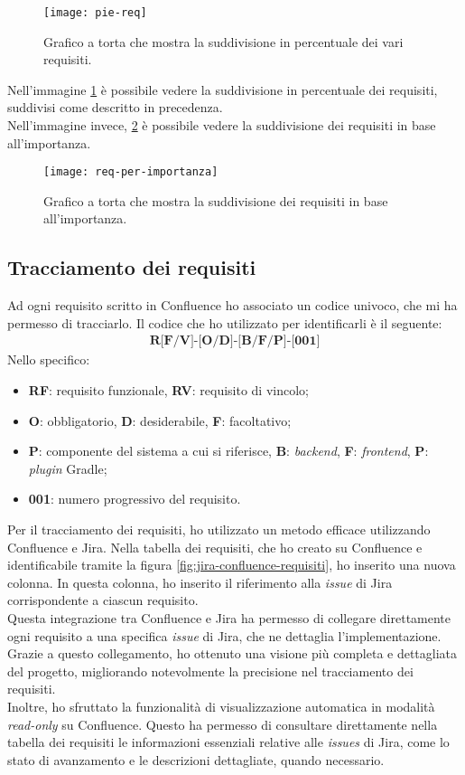 \begin{figure}[!h] 
  \centering 
  \texttt{[image: pie-req]} 
  \caption{Grafico a torta che mostra la suddivisione in percentuale dei vari requisiti.}
  \label{fig:pie-req}
\end{figure}
\noindent Nell'immagine \ref*{fig:pie-req} è possibile vedere la suddivisione in percentuale dei requisiti, 
suddivisi come descritto in precedenza.\\
Nell'immagine invece, \ref*{fig:req-per-importanza} è possibile vedere la suddivisione dei requisiti in base all'importanza.
\begin{figure}[!h] 
  \centering 
  \texttt{[image: req-per-importanza]} 
  \caption{Grafico a torta che mostra la suddivisione dei requisiti in base all'importanza.}
  \label{fig:req-per-importanza}
\end{figure}

\subsection{Tracciamento dei requisiti}
Ad ogni requisito scritto in Confluence ho associato un codice univoco, che mi ha permesso di tracciarlo.
Il codice che ho utilizzato per identificarli è il seguente:
\begin{align*}
  \textbf{R[F/V]-[O/D]-[B/F/P]-[001]}
\end{align*}
Nello specifico:
\begin{itemize}
    \item \textbf{RF}: requisito funzionale, \textbf{RV}: requisito di vincolo;
    \item \textbf{O}: obbligatorio, \textbf{D}: desiderabile, \textbf{F}: facoltativo;
    \item \textbf{P}: componente del sistema a cui si riferisce, \textbf{B}: \textit{backend}, \textbf{F}: \textit{frontend}, \textbf{P}: \textit{plugin} Gradle;
    \item \textbf{001}: numero progressivo del requisito.
\end{itemize}

\noindent Per il tracciamento dei requisiti, ho utilizzato un metodo efficace utilizzando Confluence e Jira. 
Nella tabella dei requisiti, che ho creato su Confluence e identificabile tramite la figura \ref*{fig:jira-confluence-requisiti}, 
ho inserito una nuova colonna. In questa colonna, ho inserito il riferimento alla \textit{issue} di 
Jira corrispondente a ciascun requisito.\\
Questa integrazione tra Confluence e Jira ha permesso di collegare direttamente ogni requisito a una specifica 
\textit{issue} di Jira, che ne dettaglia l'implementazione. Grazie a questo collegamento, ho ottenuto una visione più 
completa e dettagliata del progetto, migliorando notevolmente la precisione nel tracciamento dei requisiti.\\
Inoltre, ho sfruttato la funzionalità di visualizzazione automatica in modalità \textit{read-only} su Confluence. 
Questo ha permesso di consultare direttamente nella tabella dei requisiti le informazioni essenziali relative alle \textit{issues} 
di Jira, come lo stato di avanzamento e le descrizioni dettagliate, quando necessario.

